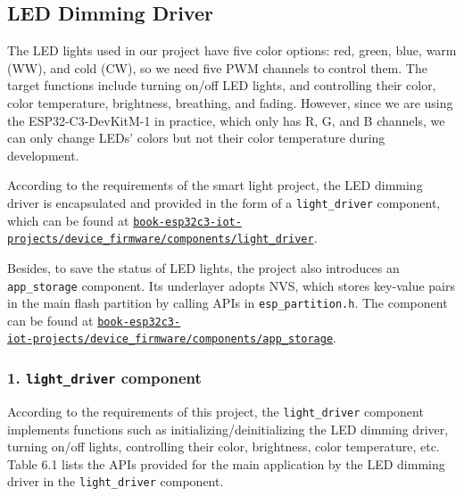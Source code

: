 \documentclass[a4paper,12pt,openany]{book}
\begin{document}
\subsection{LED Dimming Driver}
The LED lights used in our project have five color options: red, green, blue, warm (WW), and cold (CW), so we need five PWM channels to control them. The target functions include turning on/off LED lights, and controlling their color, color temperature, brightness, breathing, and fading. However, since we are using the ESP32-C3-DevKitM-1 in practice, which only has R, G, and B channels, we can only change LEDs’ colors but not their color temperature during development.

According to the requirements of the smart light project, the LED dimming driver is encapsulated and provided in the form of a \verb|light_driver| component, which can be found at \href{https://github.com/espressif/book-esp32c3-iot-projects/tree/main/device_firmware/components/light_driver}{\texttt{book-esp32c3-iot-projects/device\_firmware/components/light\_driver}}.

Besides, to save the status of LED lights, the project also introduces an \verb|app_storage| component. Its underlayer adopts NVS, which stores key-value pairs in the main flash partition by calling APIs in \verb|esp_partition.h|. The component can be found at \href{https://github.com/espressif/book-esp32c3-iot-projects/tree/main/device_firmware/components/app_storage}{\texttt{book-esp32c3-\\ iot-projects/device\_firmware/components/app\_storage}}.

\subsubsection{1. \texttt{light\_driver} component}
According to the requirements of this project, the \verb|light_driver| component implements functions such as initializing/deinitializing the LED dimming driver, turning on/off lights, controlling their color, brightness, color temperature, etc. Table 6.1 lists the APIs provided for the main application by the LED dimming driver in the \verb|light_driver| component.
\end{document}
